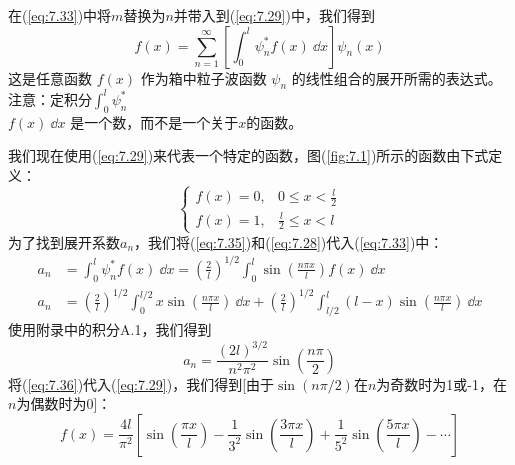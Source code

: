     在(\ref{eq:7.33})中将$m$替换为$n$并带入到(\ref{eq:7.29})中，我们得到
    \begin{equation}
        f\left(x\right) = \sum_{n=1}^{\infty} \left[\int_{0}^{l} \psi_n^{\ast} f\left(x\right) \: \dd x\right] \psi_n\left(x\right)
        \label{eq:7.34}
    \end{equation}
    这是任意函数 $f\left(x\right)$ 作为箱中粒子波函数 $\psi_n$ 的线性组合的展开所需的表达式。注意：定积分$\int_{0}^{l} \psi_n^{\ast} $\\$f\left(x\right) \: \dd x$ 是一个数，而不是一个关于$x$的函数。

    我们现在使用(\ref{eq:7.29})来代表一个特定的函数，图(\ref{fig:7.1})所示的函数由下式定义：
    \begin{equation}
        \begin{cases}
            f\left(x\right) = 0, & 0 \leq x < \frac{l}{2} \\
            f\left(x\right) = 1, & \frac{l}{2} \leq x < l
        \end{cases}
        \label{eq:7.35}
    \end{equation}
    为了找到展开系数$a_n$，我们将(\ref{eq:7.35})和(\ref{eq:7.28})代入(\ref{eq:7.33})中：
    \begin{equation*}
        \begin{aligned}
            a_n &= \int_{0}^{l} \psi_n^{\ast} f\left(x\right) \: \dd x = \left(\frac{2}{l}\right)^{1/2} \int_{0}^{l} \sin\left(\frac{n\pi x}{l}\right) f\left(x\right) \: \dd x \\
            a_n &= \left(\frac{2}{l}\right)^{1/2} \int_{0}^{l/2} x\sin\left(\frac{n\pi x}{l}\right) \: \dd x + \left(\frac{2}{l}\right)^{1/2} \int_{l/2}^{l} \left(l-x\right)\sin\left(\frac{n\pi x}{l}\right) \: \dd x
        \end{aligned}
    \end{equation*}
    使用附录中的积分A.1，我们得到
    \begin{equation}
        a_n = \frac{\left(2l\right)^{3/2}}{n^2\pi^2}\sin\left(\frac{n\pi}{2}\right)
        \label{eq:7.36}
    \end{equation}
    将(\ref{eq:7.36})代入(\ref{eq:7.29})，我们得到[由于$\sin\left(n\pi/2\right)$在$n$为奇数时为1或-1，在$n$为偶数时为0]：
    \begin{equation*}
        f\left(x\right) = \frac{4l}{\pi^2}\left[\sin\left(\frac{\pi x}{l}\right) - \frac{1}{3^2}\sin\left(\frac{3\pi x}{l}\right) + \frac{1}{5^2}\sin\left(\frac{5\pi x}{l}\right) - \cdots\right]
    \end{equation*}
